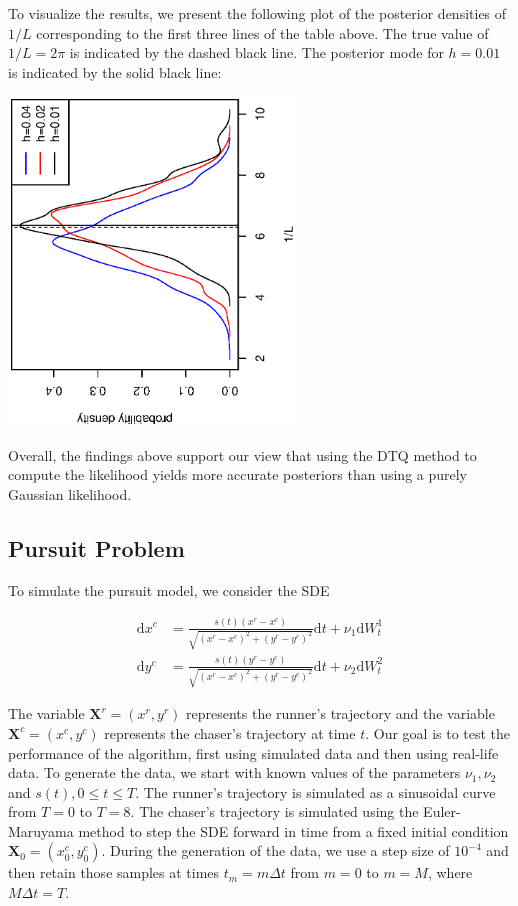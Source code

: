 \documentclass[graybox]{svmult}
\begin{document}
To visualize the results, we present the following plot of the posterior densities of $1/L$ corresponding to the first three lines of the table above.  The true value of $1/L = 2 \pi$ is indicated by the dashed black line.  The posterior mode for $h = 0.01$ is indicated by the solid black line:
\vspace{-0.6in}
\begin{center}
\includegraphics[width=3in,angle=270]{densities.eps}
\end{center}
\vspace{-0.1in}
Overall, the findings above support our view that using the DTQ method to compute the likelihood yields more accurate posteriors than using a purely Gaussian likelihood.


\subsection{Pursuit Problem}
\label{subsec:3-2}
To simulate the pursuit model, we consider the SDE

\begin{align*}
\mathrm{d} x^{c} & = \frac{s(t) (x^{r} - x^{c})}{\sqrt{(x^{r} - x^{c})^2 + (y^{r} - y^{c})^2}} \mathrm{d}t + \nu_1 \mathrm{d}W^1_t \\
\mathrm{d} y^{c} & = \frac{s(t) (y^{r} - y^{c})}{\sqrt{(x^{r} - x^{c})^2 + (y^{r} - y^{c})^2}} \mathrm{d}t + \nu_2 \mathrm{d}W^2_t
\end{align*}

The variable $\mathbf{X}^r = (x^r, y^r)$ represents the runner's trajectory and the variable $\mathbf{X}^c = (x^c, y^c)$ represents the chaser's trajectory at time $t$. Our goal is to test the performance of the algorithm, first using simulated data and then using real-life data. To generate the data, we start with known values of the parameters $\nu_1, \nu_2$ and $s(t), 0 \leq t \leq T$. The runner's trajectory is simulated as a sinusoidal curve from $T = 0$ to $T = 8$. The chaser's trajectory is simulated using the Euler-Maruyama method to step the SDE forward in time from a fixed initial condition $\mathbf{X}_0 = (x^c_0, y^c_0)$.  During the generation of the data, we use a step size of $10^{-4}$ and then retain those samples at times $t_m = m \Delta t$ from $m = 0$ to $m = M$, where $M \Delta t = T$. \\
\end{document}

